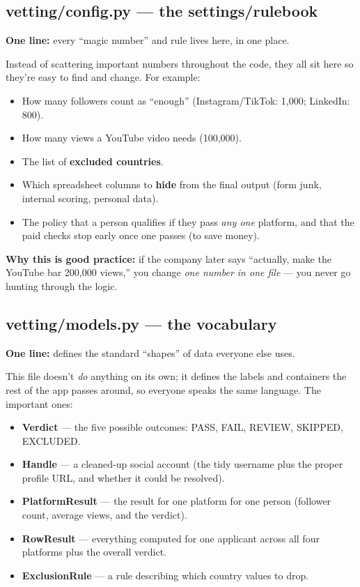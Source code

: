 \documentclass[11pt]{article}
\newcommand{\term}[1]{\textbf{\color{brandpurple}#1}}
\begin{document}
\subsection{vetting/config.py — the settings/rulebook}
\begin{plainbox}
\textbf{One line:} every ``magic number'' and rule lives here, in one place.
\end{plainbox}

Instead of scattering important numbers throughout the code, they all sit here
so they're easy to find and change. For example:
\begin{itemize}
  \item How many followers count as ``enough'' (Instagram/TikTok: 1,000;
  LinkedIn: 800).
  \item How many views a YouTube video needs (100,000).
  \item The list of \textbf{excluded countries}.
  \item Which spreadsheet columns to \textbf{hide} from the final output (form
  junk, internal scoring, personal data).
  \item The policy that a person qualifies if they pass \emph{any one} platform,
  and that the paid checks stop early once one passes (to save money).
\end{itemize}

\begin{analogybox}
\textbf{Why this is good practice:} if the company later says ``actually, make
the YouTube bar 200,000 views,'' you change \emph{one number in one file} — you
never go hunting through the logic.
\end{analogybox}

\subsection{vetting/models.py — the vocabulary}
\begin{plainbox}
\textbf{One line:} defines the standard ``shapes'' of data everyone else uses.
\end{plainbox}

This file doesn't \emph{do} anything on its own; it defines the labels and
containers the rest of the app passes around, so everyone speaks the same
language. The important ones:
\begin{itemize}
  \item \term{Verdict} — the five possible outcomes: PASS, FAIL, REVIEW,
  SKIPPED, EXCLUDED.
  \item \term{Handle} — a cleaned-up social account (the tidy username plus the
  proper profile URL, and whether it could be resolved).
  \item \term{PlatformResult} — the result for one platform for one person
  (follower count, average views, and the verdict).
  \item \term{RowResult} — everything computed for one applicant across all four
  platforms plus the overall verdict.
  \item \term{ExclusionRule} — a rule describing which country values to drop.
\end{itemize}
\end{document}
